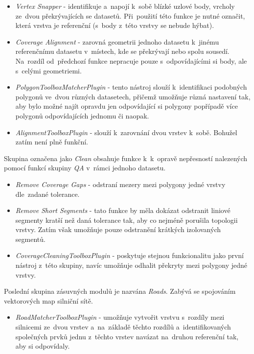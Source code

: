 \begin{itemize}
 \item \textit{Vertex Snapper} - identifikuje a~napojí k~sobě blízké uzlové
    body, vrcholy ze~dvou překrývajících se datasetů. Při~použití této funkce
    je nutné označit, která vrstva je referenční (s~body z~této vrstvy se 
    nebude hýbat).
 \item \textit{Coverage Alignment} - zarovná geometrii jednoho datasetu 
    k~jinému referenčnímu datasetu v~místech, kde se překrývají nebo spolu
    sousedí. Na~rozdíl od~předchozí funkce nepracuje pouze s~odpovídajícími
    si body, ale s~celými geometriemi.
 \item \textit{PolygonToolboxMatcherPlugin} - tento nástroj slouží k~identifikaci
    podobných polygonů ve~dvou různých datasetech, přičemž umožňuje různá 
    nastavení tak, aby bylo možné najít opravdu jen odpovídající si polygony
    popřípadě více polygonů odpovídajících jednomu či naopak. 
 \item \textit{AlignmentToolboxPlugin} - slouží k~zarovnání dvou vrstev k~sobě.
    Bohužel zatím není plně funkční.
\end{itemize}

Skupina označena jako \textit{Clean} obsahuje funkce k~k~opravě nepřesností
nalezených pomocí funkcí skupiny \textit{QA} v~rámci jednoho datasetu.

\begin{itemize}
 \item \textit{Remove Coverage Gaps} - odstraní mezery mezi polygony jedné
    vrstvy dle~zadané tolerance.
 \item \textit{Remove Short Segments} - tato funkce by měla dokázat odstranit
    liniové segmenty kratší než daná tolerance tak, aby co nejméně porušila 
    topologii vrstvy. Zatím však umožňuje pouze odstranění krátkých izolovaných
    segmentů.
 \item \textit{CoverageCleaningToolboxPlugin} - poskytuje stejnou funkcionalitu
    jako první ná\-stroj z~této skupiny, navíc umožňuje odhalit překryty 
    mezi polygony jedné vrstvy.
\end{itemize}

Poslední skupina zásuvných modulů je nazvána \textit{Roads}. Zabývá se 
spojováním vektorových map silniční sítě.

\begin{itemize}
 \item \textit{RoadMatcherToolboxPlugin} - umožňuje vytvořit vrstvu s~rozdíly
    mezi silnicemi ze~dvou vrstev a~na~základě těchto rozdílů a~identifikovaných
    společných prvků jednu z~těchto vrstev navázat na~druhou referenční tak, 
    aby si odpovídaly.
\end{itemize}



